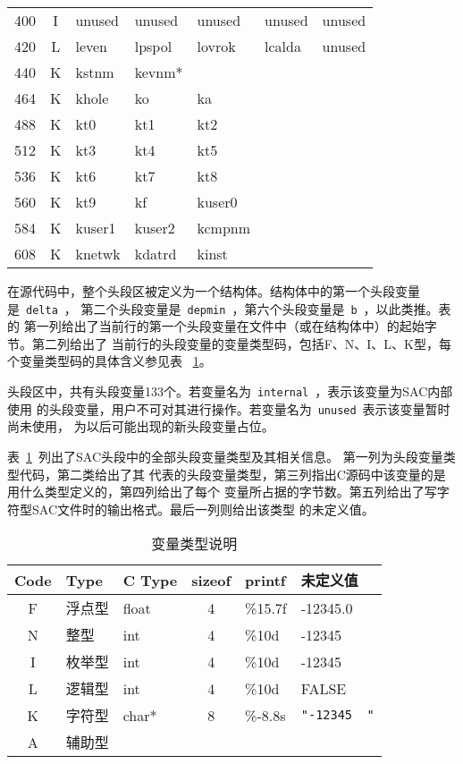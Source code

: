\begin{table}[H]
\begin{tabular}{c|c|lllll}
	400		&	I	&	unused	&	unused	&	unused	&	unused	&	unused	\\
	420		&	L	&	leven	&	lpspol	&	lovrok	&	lcalda	&	unused	\\
	440		&	K	&	kstnm	&	kevnm*	&			&			&			\\
	464		&	K	&	khole	&	ko		&	ka		&			&			\\
	488		&	K	&	kt0		&	kt1		&	kt2		&			&			\\
	512		&	K	&	kt3		&	kt4		&	kt5		&			&			\\
	536		&	K	&	kt6		&	kt7		&	kt8		&			&			\\
	560		&	K	&	kt9		&	kf		&	kuser0	&			&			\\
	584		&	K	&	kuser1	&	kuser2	&	kcmpnm	&			&			\\
	608		&	K	&	knetwk	&	kdatrd	&	kinst	&			&			\\
    \bottomrule
\end{tabular}
\end{table}

在源代码中，整个头段区被定义为一个结构体。结构体中的第一个头段变量是~\verb+delta+~，
第二个头段变量是~\verb+depmin+~，第六个头段变量是~\verb+b+~，以此类推。表的
第一列给出了当前行的第一个头段变量在文件中（或在结构体中）的起始字节。第二列给出了
当前行的头段变量的变量类型码，包括F、N、I、L、K型，每个变量类型码的具体含义参见表
~\ref{table:header-variables-type}。

头段区中，共有头段变量133个。若变量名为~\verb+internal+~，表示该变量为SAC内部使用
的头段变量，用户不可对其进行操作。若变量名为~\verb+unused+~表示该变量暂时尚未使用，
为以后可能出现的新头段变量占位。


表~\ref{table:header-variables-type}~列出了SAC头段中的全部头段变量类型及其相关信息。
第一列为头段变量类型代码，第二类给出了其
代表的头段变量类型，第三列指出C源码中该变量的是用什么类型定义的，第四列给出了每个
变量所占据的字节数。第五列给出了写字符型SAC文件时的输出格式。最后一列则给出该类型
的未定义值。

\begin{table}[H]
\caption{变量类型说明}
\label{table:header-variables-type}
\centering
\ttfamily
\small
\begin{tabular}{cllcll}
	\toprule
    Code    &	Type        &   C Type & sizeof &   printf	&   未定义值        \\
	\midrule
    F		&	浮点型		&   float  &  4     &	\%15.7f &   -12345.0        \\
    N		&	整型		&   int    &  4     &	\%10d   &   -12345        \\
    I		&	枚举型		&   int    &  4     &	\%10d   &   -12345	        \\
    L		&	逻辑型		&   int    &  4     &	\%10d   &   FALSE        \\
    K		&	字符型		&   char*  &  8     &	\%-8.8s & \lstinline[showspaces=true]{"-12345  "}     \\
    A		&	辅助型		&          &        &			& 	    \\
	\bottomrule
\end{tabular}
\end{table}


